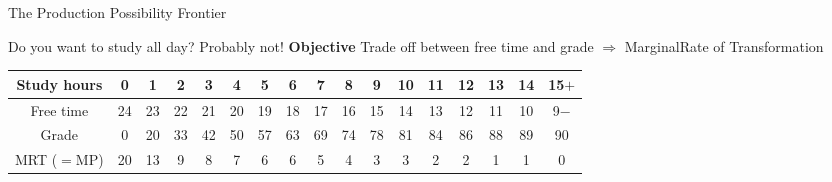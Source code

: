 \documentclass[11pt,aspectratio=43,usenames,dvipsnames]{beamer}
\theoremstyle{definition}
\begin{document}
\begin{frame}{The Production Possibility Frontier}
\label{slide:The_Production_Possibility_Frontier}

 { Do you want to study all day? Probably not! }
 { \textbf{Objective} Trade off between free time and grade $ \Rightarrow  $ M{\tiny arginal}R{\tiny ate of }T{\tiny ransformation}}

\begin{center}
\tiny
\begin{tabular}{c|c|c|c|c|c|c|c|c|c|c|c|c|c|c|c|c}
    Study hours  & 0  & 1  & 2  & 3  & 4  & 5  & 6  & 7  & 8  & 9  & 10  & 11  & 12  & 13  & 14  & 15$+$
    \\
    \hline
    Free time & 24  & 23  & 22  & 21  & 20  & 19  & 18  & 17  & 16  & 15  & 14  & 13  & 12  & 11  & 10  & 9$-$
    \\
    \hline
    Grade  & 0  & 20  & 33  & 42  & 50  & 57  & 63  & 69  & 74  & 78  & 81  & 84  & 86  & 88  & 89  & 90
    \\
    \hline
    MRT ($=$MP) & 20  & 13  & 9  & 8  & 7  & 6  & 6  & 5  & 4  & 3  & 3  & 2  & 2  & 1  &  1 & 0
    \\
\end{tabular}

\end{center}

\end{frame}
\end{document}
